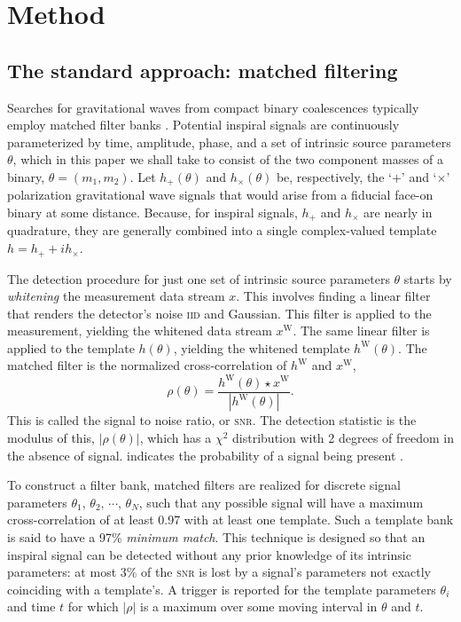 \section{Method}
\label{SECII}\label{sec:method}
\subsection{The standard approach: matched filtering}

Searches for gravitational waves from compact binary coalescences typically
employ matched filter banks \cite{findchirppaper}.  Potential inspiral signals
are continuously parameterized by time, amplitude, phase, and a set of
intrinsic source parameters $\theta$, which in this paper we shall take to
consist of the two component masses of a binary, $\theta = (m_1, m_2)$.  Let
$h_+(\theta)$ and $h_\times(\theta)$ be, respectively, the `$+$' and `$\times$'
polarization gravitational wave signals that would arise from a fiducial
face-on binary at some distance.  Because, for inspiral signals, $h_+$ and
$h_\times$ are nearly in quadrature, they are generally combined into a single
complex-valued template $h = h_+ + i h_\times$.

The detection procedure for just one set of intrinsic source parameters
$\theta$ starts by {\em whitening} the measurement data stream $x$.  This
involves finding a linear filter that renders the detector's noise \textsc{iid}
and Gaussian.  This filter is applied to the measurement, yielding the whitened
data stream $x^\mathrm W$.  The same linear filter is applied to the template
$h(\theta)$, yielding the whitened template $h^\mathrm W (\theta)$.  The
matched filter is the normalized cross-correlation of $h^\mathrm W$ and
$x^\mathrm W$, 
%
$$
%
\rho(\theta) = \frac{h^\mathrm W (\theta) \star x^\mathrm W}{|h^\mathrm W
(\theta)|}.
%
$$
%
This is called the signal to noise ratio, or \textsc{snr}.  The detection
statistic is the modulus of this, $|\rho(\theta)|$, which has a $\chi^2$
distribution with 2 degrees of freedom in the absence of signal.%
indicates the probability of a signal being present
\cite{wainstein:1962}.

To construct a filter bank, matched filters are realized for discrete signal
parameters $\theta_1,\, \theta_2,\, \cdots$, $\theta_N$, such that any possible
signal will have a maximum cross-correlation of at least 0.97 with at least one
template.    Such
a template bank is said to have a 97\% {\em minimum match}.  This technique is
designed so that an inspiral signal can be detected without any prior knowledge
of its intrinsic parameters: at most 3\% of the \textsc{snr} is lost by a
signal's parameters not exactly coinciding with a template's.  A trigger is
reported for the template parameters $\theta_i$ and time $t$ for which $|\rho|$
is a maximum over some moving interval in $\theta$ and $t$.


